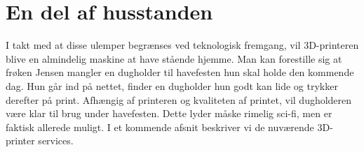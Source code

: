 
\section{En del af husstanden} %
\label{par:en_del_af_husstanden}


I takt med at disse ulemper begrænses ved teknologisk fremgang, vil 3D-printeren blive en almindelig maskine at have stående hjemme. Man kan forestille sig at frøken Jensen mangler en dugholder til havefesten hun skal holde den kommende dag. Hun går ind på nettet, finder en dugholder hun godt kan lide og trykker derefter på print. Afhængig af printeren og kvaliteten af printet, vil dugholderen være klar til brug under havefesten. Dette lyder måske rimelig sci-fi, men er faktisk allerede muligt. I et kommende afsnit beskriver vi de nuværende 3D-printer services.

